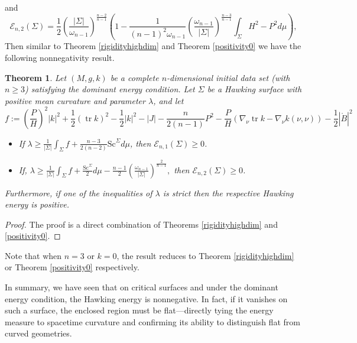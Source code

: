 \documentclass[12pt,a4paper]{amsart}
\theoremstyle{plain}
\newtheorem{theorem}{Theorem}[section]
\theoremstyle{definition}
\newcommand{\tr}{\operatorname{tr}}
\begin{document}
and 
\begin{equation}
\mathcal{E}_{n,2}(\Sigma) =    \frac{1}{2} \left( \frac{|\Sigma|}{\omega_{n-1}} \right)^{\frac{n-2}{n-1}} \left(1 - \frac{1}{(n-1)^2 \omega_{n-1}} \left( \frac{\omega_{n-1}}{ |\Sigma|} \right)^{\frac{n-3}{n-1}} \int_{\Sigma }H^2 -P^2 d\mu \right),
\end{equation}
Then similar to Theorem \ref{rigidityhighdim} and Theorem \ref{positivity0} we have the following nonnegativity result.
\begin{theorem}\label{posidynhigh}
    Let $(M,g,k)$ be a complete $n$-dimensional initial data set (with $n\geq 3$) satisfying the dominant energy condition.   Let $\Sigma $ be a Hawking surface with positive mean curvature
    and  parameter $\lambda$, and let
  $$f:= \left( \frac{P}{H}\right)^2|k|^2+ \frac{1}{2 }(\tr k)^2 -  \frac{1}{2} |k|^2 -|J|   - \frac{n}{2(n-1)} P^2- \frac{P}{H}( \nabla_\nu \tr k - \nabla_\nu k(\nu,\nu )) -\frac{1}{2} |\mathring{B}|^2$$
\begin{itemize}
    \item[$i)$]  If $
         \lambda  \geq \frac{1}{|\Sigma|}\int_{\Sigma}  f+ \frac{n-3}{2(n-2)}  \mathrm{Sc}^{\Sigma} d\mu$, 
       then  $\mathcal{E}_{n,1}(\Sigma)\geq 0$.
    \item[$ii)$]  If, $
         \lambda  \geq  \frac{1}{|\Sigma|}\int_{\Sigma} f+
 \frac{\mathrm{Sc}^{\Sigma}}{2} d\mu  -\frac{n-1}{2} \left( \frac{\omega_{n-1}}{ |\Sigma|} \right)^{\frac{2}{n-1}},$
       then  $\mathcal{E}_{n,2}(\Sigma)\geq 0$. 
\end{itemize}
Furthermore, if one of the inequalities of $\lambda$ is strict then the respective Hawking energy is positive.
\end{theorem}
\begin{proof}
    The proof is a direct combination of Theorems \ref{rigidityhighdim} and \ref{positivity0}.
\end{proof}
Note that when $n=3$ or $k=0$, the result reduces to Theorem \ref{rigidityhighdim} or Theorem \ref{positivity0} respectively. 





In summary, we have seen that on critical surfaces and under the dominant energy condition,  the Hawking energy is nonnegative. In fact,  if it vanishes on such a surface, the enclosed region must be flat—directly tying the energy measure to spacetime curvature and confirming its ability to distinguish flat from curved geometries.
\end{document}
